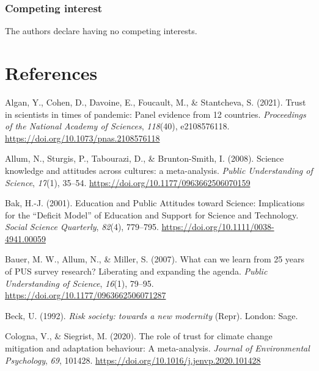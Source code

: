 \documentclass[
  doc,floatsintext]{apa6}
\newlength{\cslhangindent}
\newenvironment{CSLReferences}[2] %
 {\begin{list}{}{%
  \setlength{\itemindent}{0pt}
  \setlength{\leftmargin}{0pt}
  \setlength{\parsep}{0pt}
  \ifodd #1
   \setlength{\leftmargin}{\cslhangindent}
   \setlength{\itemindent}{-1\cslhangindent}
  \fi
  \setlength{\itemsep}{#2\baselineskip}}}
 {\end{list}}
\begin{document}
\subsubsection{Competing interest}\label{competing-interest}

The authors declare having no competing interests.

\FloatBarrier

\section{References}\label{references}

\label{refs}
\begin{CSLReferences}{1}{0}
Algan, Y., Cohen, D., Davoine, E., Foucault, M., \& Stantcheva, S. (2021). Trust in scientists in times of pandemic: Panel evidence from 12 countries. \emph{Proceedings of the National Academy of Sciences}, \emph{118}(40), e2108576118. \url{https://doi.org/10.1073/pnas.2108576118}

Allum, N., Sturgis, P., Tabourazi, D., \& Brunton-Smith, I. (2008). Science knowledge and attitudes across cultures: a meta-analysis. \emph{Public Understanding of Science}, \emph{17}(1), 35--54. \url{https://doi.org/10.1177/0963662506070159}

Bak, H.-J. (2001). Education and Public Attitudes toward Science: Implications for the {``}Deficit Model{''} of Education and Support for Science and Technology. \emph{Social Science Quarterly}, \emph{82}(4), 779--795. \url{https://doi.org/10.1111/0038-4941.00059}

Bauer, M. W., Allum, N., \& Miller, S. (2007). What can we learn from 25 years of PUS survey research? Liberating and expanding the agenda. \emph{Public Understanding of Science}, \emph{16}(1), 79--95. \url{https://doi.org/10.1177/0963662506071287}

Beck, U. (1992). \emph{Risk society: towards a new modernity} (Repr). London: Sage.

Cologna, V., \& Siegrist, M. (2020). The role of trust for climate change mitigation and adaptation behaviour: A meta-analysis. \emph{Journal of Environmental Psychology}, \emph{69}, 101428. \url{https://doi.org/10.1016/j.jenvp.2020.101428}


\end{CSLReferences}
\end{document}
